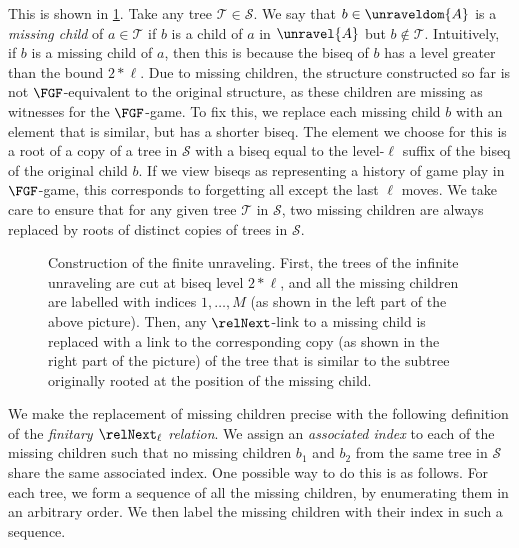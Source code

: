 This is shown in \cref{fig:finite-unraveling}.
Take any tree $\mathcal{T} \in \mathcal{S}$.
We say that $b \in \unraveldom{A}$ is a \emph{missing child} of $a \in \mathcal{T}$ if $b$ is a child of $a$ in $\unravel{A}$ but $b \notin \mathcal{T}$.
Intuitively, if $b$ is a missing child of $a$, then this is because the biseq of $b$ has a level greater than the bound $2 * \ell$.
Due to missing children, the structure constructed so far is not $\FGF$-equivalent to the original structure, as these children are missing as witnesses for the $\FGF$-game.
To fix this, we replace each missing child $b$ with an element that is similar, but has a shorter biseq.
The element we choose for this is a root of a copy of a tree in $\mathcal{S}$ with a biseq equal to the level-$\ell$ suffix of the biseq of the original child $b$.
If we view biseqs as representing a history of game play in $\FGF$-game, this corresponds to forgetting all except the last $\ell$ moves.
We take care to ensure that for any given tree $\mathcal{T}$ in $\mathcal{S}$, two missing children are always replaced by roots of distinct copies of trees in $\mathcal{S}$.

\begin{figure}
  \centering
  
  \caption{Construction of the finite unraveling. First, the trees of the infinite unraveling are cut at biseq level $2*\ell$, and all the missing children are labelled with indices $1, \ldots, M$ (as shown in the left part of the above picture). Then, any $\relNext$-link to a missing child is replaced with a link to the corresponding copy (as shown in the right part of the picture) of the tree that is similar to the subtree originally rooted at the position of the missing child.}
  \label{fig:finite-unraveling}
\end{figure}

We make the replacement of missing children precise with the following definition of the \emph{finitary $\relNext_{\ell}$ relation}.
We assign an \emph{associated index} to each of the missing children such that no missing children $b_{1}$ and $b_{2}$ from the same tree in $\mathcal{S}$ share the same associated index.
One possible way to do this is as follows.
For each tree, we form a sequence of all the missing children, by enumerating them in an arbitrary order.
We then label the missing children with their index in such a sequence.


